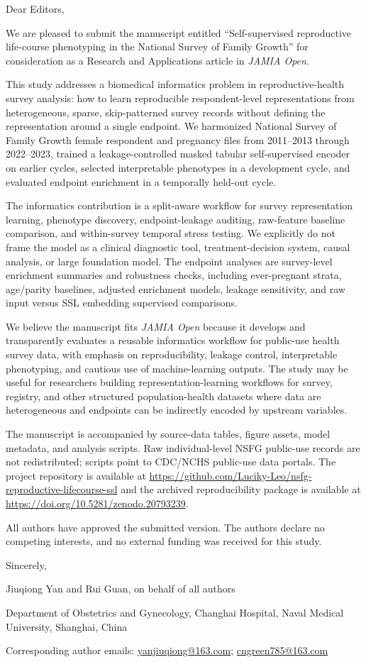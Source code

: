 \documentclass[11pt]{article}
\begin{document}
Dear Editors,

We are pleased to submit the manuscript entitled ``Self-supervised reproductive life-course phenotyping in the National Survey of Family Growth'' for consideration as a Research and Applications article in \emph{JAMIA Open}.

This study addresses a biomedical informatics problem in reproductive-health survey analysis: how to learn reproducible respondent-level representations from heterogeneous, sparse, skip-patterned survey records without defining the representation around a single endpoint. We harmonized National Survey of Family Growth female respondent and pregnancy files from 2011--2013 through 2022--2023, trained a leakage-controlled masked tabular self-supervised encoder on earlier cycles, selected interpretable phenotypes in a development cycle, and evaluated endpoint enrichment in a temporally held-out cycle.

The informatics contribution is a split-aware workflow for survey representation learning, phenotype discovery, endpoint-leakage auditing, raw-feature baseline comparison, and within-survey temporal stress testing. We explicitly do not frame the model as a clinical diagnostic tool, treatment-decision system, causal analysis, or large foundation model. The endpoint analyses are survey-level enrichment summaries and robustness checks, including ever-pregnant strata, age/parity baselines, adjusted enrichment models, leakage sensitivity, and raw input versus SSL embedding supervised comparisons.

We believe the manuscript fits \emph{JAMIA Open} because it develops and transparently evaluates a reusable informatics workflow for public-use health survey data, with emphasis on reproducibility, leakage control, interpretable phenotyping, and cautious use of machine-learning outputs. The study may be useful for researchers building representation-learning workflows for survey, registry, and other structured population-health datasets where data are heterogeneous and endpoints can be indirectly encoded by upstream variables.

The manuscript is accompanied by source-data tables, figure assets, model metadata, and analysis scripts. Raw individual-level NSFG public-use records are not redistributed; scripts point to CDC/NCHS public-use data portals. The project repository is available at \url{https://github.com/Luciky-Leo/nsfg-reproductive-lifecourse-ssl} and the archived reproducibility package is available at \url{https://doi.org/10.5281/zenodo.20793239}.

All authors have approved the submitted version. The authors declare no competing interests, and no external funding was received for this study.

Sincerely,

Jiuqiong Yan and Rui Guan, on behalf of all authors

Department of Obstetrics and Gynecology, Changhai Hospital, Naval Medical University, Shanghai, China

Corresponding author emails: \href{mailto:yanjiuqiong@163.com}{yanjiuqiong@163.com}; \href{mailto:cngreen785@163.com}{cngreen785@163.com}
\end{document}
